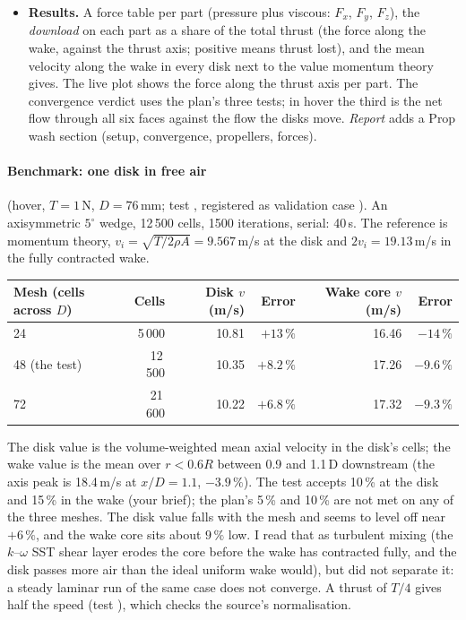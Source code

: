 \begin{itemize}[nosep]
        wake $2v_i$ from momentum theory), the cell count with the share in the disks, a warning if a disk's
        centre is inside a part, and an error when the diameter is blank or no motor is marked.
  \item \textbf{Results.} A force table per part (pressure plus viscous: $F_x$, $F_y$, $F_z$), the
        \emph{download} on each part as a share of the total thrust (the force along the wake, against the thrust
        axis; positive means thrust lost), and the mean velocity along the wake in every disk next to the value
        momentum theory gives. The live plot shows the force along the thrust axis per part. The convergence
        verdict uses the plan's three tests; in hover the third is the net flow through all six faces against
        the flow the disks move. \emph{Report} adds a Prop wash section (setup, convergence, propellers, forces).
\end{itemize}

\paragraph{Benchmark: one disk in free air} (hover, $T=1$\,N, $D=76$\,mm; test
, registered as validation case ). An axisymmetric
$5^\circ$ wedge, 12\,500 cells, 1500 iterations, serial: 40\,s. The reference is momentum theory,
$v_i=\sqrt{T/2\rho A}=9.567$\,m/s at the disk and $2v_i=19.13$\,m/s in the fully contracted wake.
\begin{center}\small
\begin{tabular}{@{}lrrrrr@{}}
\toprule Mesh (cells across $D$) & Cells & Disk $v$ (m/s) & Error & Wake core $v$ (m/s) & Error\\ \midrule
24 & 5\,000 & 10.81 & $+13\,\%$ & 16.46 & $-14\,\%$\\
48 (the test) & 12\,500 & 10.35 & $+8.2\,\%$ & 17.26 & $-9.6\,\%$\\
72 & 21\,600 & 10.22 & $+6.8\,\%$ & 17.32 & $-9.3\,\%$\\
\bottomrule
\end{tabular}
\end{center}
The disk value is the volume-weighted mean axial velocity in the disk's cells; the wake value is the mean over
$r<0.6R$ between 0.9 and 1.1\,D downstream (the axis peak is 18.4\,m/s at $x/D=1.1$, $-3.9\,\%$). The test accepts
10\,\% at the disk and 15\,\% in the wake (your brief); the plan's 5\,\% and 10\,\% are not met on any of the three
meshes. The disk value falls with the mesh and seems to level off near $+6\,\%$, and the wake core sits about
$9\,\%$ low. I read that as turbulent mixing (the $k$--$\omega$ SST shear layer erodes the core before the wake has
contracted fully, and the disk passes more air than the ideal uniform wake would), but did not separate it: a steady
laminar run of the same case does not converge. A thrust of $T/4$ gives half the speed (test
), which checks the source's normalisation.

